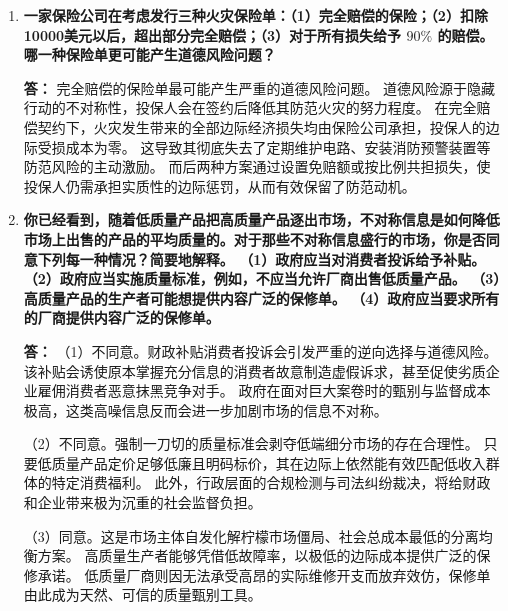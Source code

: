 \begin{enumerate}[label=\textbf{\arabic*.}, leftmargin=*]
		\textbf{答：} 真实广告能够有效降低消费者的信息搜寻成本，提升市场信息透明度。
		消费者得以在不同品牌的价格与真实质量之间进行理性横向对比，从而强化了效率优胜劣汰的竞争机制。
		
		相反，欺骗性广告会严重扭曲市场信号，导致消费者无法对产品真实性价比做出准确评估。
		面对质量的不确定性，买方会产生防御性心理，倾向于长期锁死在已经验证的少数成熟大牌上。
		这不仅压制了现有厂商之间的价格竞争，还对高质新厂商构成了极高的声誉壁垒与市场准入障碍。
		
		\item \textbf{一家保险公司在考虑发行三种火灾保险单：（1）完全赔偿的保险；（2）扣除10000美元以后，超出部分完全赔偿；（3）对于所有损失给予 $90\%$ 的赔偿。哪一种保险单更可能产生道德风险问题？}
		
		\textbf{答：} 完全赔偿的保险单最可能产生严重的道德风险问题。
		道德风险源于隐藏行动的不对称性，投保人会在签约后降低其防范火灾的努力程度。
		在完全赔偿契约下，火灾发生带来的全部边际经济损失均由保险公司承担，投保人的边际受损成本为零。
		这导致其彻底失去了定期维护电路、安装消防预警装置等防范风险的主动激励。
		而后两种方案通过设置免赔额或按比例共担损失，使投保人仍需承担实质性的边际惩罚，从而有效保留了防范动机。
		
		\item \textbf{你已经看到，随着低质量产品把高质量产品逐出市场，不对称信息是如何降低市场上出售的产品的平均质量的。对于那些不对称信息盛行的市场，你是否同意下列每一种情况？简要地解释。
			（1）政府应当对消费者投诉给予补贴。
			（2）政府应当实施质量标准，例如，不应当允许厂商出售低质量产品。
			（3）高质量产品的生产者可能想提供内容广泛的保修单。
			（4）政府应当要求所有的厂商提供内容广泛的保修单。}
		
		\textbf{答：} （1）不同意。财政补贴消费者投诉会引发严重的逆向选择与道德风险。
		该补贴会诱使原本掌握充分信息的消费者故意制造虚假诉求，甚至促使劣质企业雇佣消费者恶意抹黑竞争对手。
		政府在面对巨大案卷时的甄别与监督成本极高，这类高噪信息反而会进一步加剧市场的信息不对称。
		
		（2）不同意。强制一刀切的质量标准会剥夺低端细分市场的存在合理性。
		只要低质量产品定价足够低廉且明码标价，其在边际上依然能有效匹配低收入群体的特定消费福利。
		此外，行政层面的合规检测与司法纠纷裁决，将给财政和企业带来极为沉重的社会监督负担。
		
		（3）同意。这是市场主体自发化解柠檬市场僵局、社会总成本最低的分离均衡方案。
		高质量生产者能够凭借低故障率，以极低的边际成本提供广泛的保修承诺。
		低质量厂商则因无法承受高昂的实际维修开支而放弃效仿，保修单由此成为天然、可信的质量甄别工具。
		

\end{enumerate}

